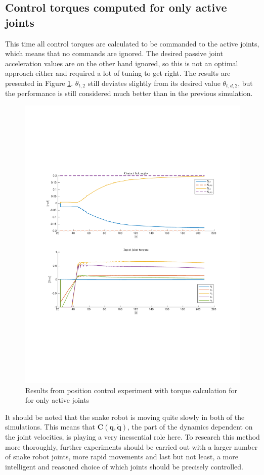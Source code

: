 \subsection{Control torques computed for only active joints}

This time all control torques are calculated to be commanded to the active joints, which means that no commands are ignored. The desired passive joint acceleration values are on the other hand ignored, so this is not an optimal approach either and required a lot of tuning to get right. The results are presented in Figure \ref{fig:2xp-2}. $\theta_{t,2}$ still deviates slightly from its desired value $\theta_{t,d,2}$, but the performance is still considered much better than in the previous simulation.

\begin{figure}
    \centering
    \includegraphics[trim=2.1cm 6cm 2.1cm 6cm, clip=true, width=\textwidth]{figures/experiments/2xpos/2xpos-2plot.pdf}
    \caption{Results from position control experiment with torque calculation for for only active joints}
    \label{fig:2xp-2}
\end{figure}

It should be noted that the snake robot is moving quite slowly in both of the simulations. This means that $\mathbf{C(q,\dot{q})}$, the part of the dynamics dependent on the joint velocities, is playing a very inessential role here. To research this method more thoroughly, further experiments should be carried out with a larger number of snake robot joints, more rapid movements and last but not least, a more intelligent and reasoned choice of which joints should be precisely controlled.